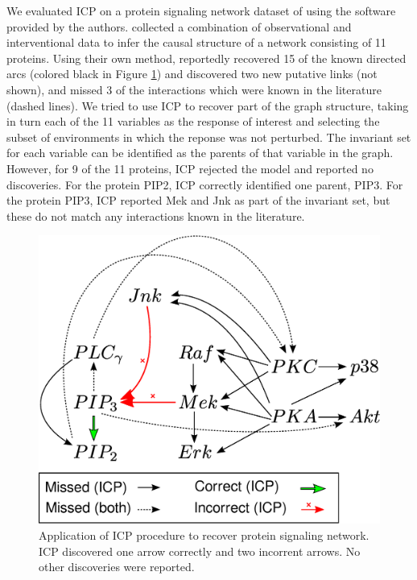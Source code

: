 \documentclass{article}
\begin{document}
We evaluated ICP on a protein signaling network dataset of
\citet{sachs2005causal} using the software provided by the authors.
\citet{sachs2005causal} collected a
combination of observational and interventional data to infer
the causal structure of a network consisting of 11 proteins.  Using
their own method, \citet{sachs2005causal} reportedly recovered 15 of
the known directed arcs (colored black in Figure \ref{fig:sachs})  and
discovered two new putative links (not shown), and missed 3 of the
interactions which were known in the literature (dashed lines). We
tried to use ICP to recover part of the graph structure, taking in
turn each of the 11 variables as the response of interest and
selecting the subset of environments in which the reponse was not perturbed.  The
invariant set for each variable can be identified as the parents of
that variable in the graph.  However, for 9 of the 11 proteins, ICP
rejected the model and reported no discoveries.  For the protein PIP2,
ICP correctly identified one parent, PIP3.  For the protein PIP3, ICP
reported Mek and Jnk as part of the invariant set, but these do not
match any interactions known in the literature.

\begin{figure}[t]
\centering
\includegraphics[scale = 0.3]{drawing2legend.eps}
\caption{Application of ICP procedure to recover protein signaling network.
ICP discovered one arrow correctly and two incorrent arrows. No other
discoveries were reported.}
\label{fig:sachs}
\end{figure}
\end{document}
